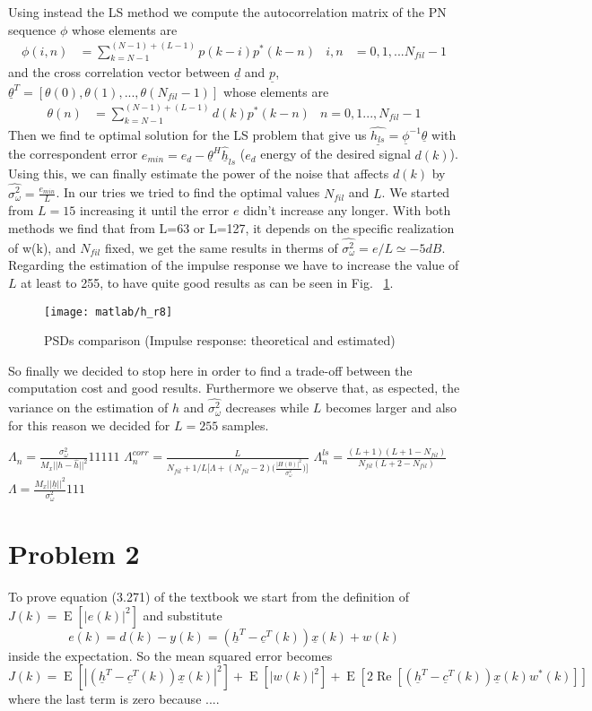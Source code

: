 \documentclass{article}
\renewcommand{\vec}[1]{\underline{#1}}
\renewcommand{\Re}[1]{\operatorname{Re}\left[#1\right]}
\newcommand{\E}[1]{\operatorname{E}\left[#1\right]}
\newcommand{\abs}[1]{\left|#1\right|}
\begin{document}
Using instead the LS method we compute the autocorrelation matrix of the PN sequence $\phi$ whose elements are 
\begin{align*}
\phi(i,n) &= \sum_{k=N-1}^{(N-1) + (L-1)}{p(k-i)p^*(k-n)}&
i,n&=0,1,...N_{fil} -1
\end{align*}
and the cross correlation vector between $\vec{d}$ and $\vec{p}$, $\vec{\theta}^T = [\theta(0), \theta(1),..., \theta(N_{fil}-1)]$ whose elements are
\begin{align*}
\theta(n)& = \sum_{k=N-1}^{(N-1) + (L-1)}{d(k)p^*(k-n)}& n=0,1...,N_{fil}-1
\end{align*}
Then we find te optimal solution for the LS problem that give us  $\vec{\hat{h_{ls}}} = \vec{\phi}^{-1} \vec{\theta}$ with the correspondent error 
$ e_{min} = e_d - \vec{\theta}^H \vec{\hat{h}}_{ls}$ ($e_d$ energy of the desired signal $d(k)$). Using this, we can finally estimate the power of the noise that affects $d(k)$ by $\hat{\sigma_\omega^2} = \frac{e_{min}}{L}$.
\newline In our tries we tried to find the optimal values $N_{fil}$ and $L$. We started from $L = 15$ increasing it until the error $e$ didn't increase any longer. With both methods we find that from L=63 or L=127, it depends on the specific realization of w(k), and $N_{fil}$ fixed, we get the same results in therms of $\hat{\sigma_\omega^2} = e/L\simeq -5 dB$. Regarding the estimation of the impulse response we have to increase the value of $L$ at least to 255, to have quite good results as can be seen in Fig. ~\ref{plot:h}.
\begin{figure}[htbp]
  \centering
  \texttt{[image: matlab/h\_r8]}
  \caption{PSDs comparison (Impulse response: theoretical and estimated)}
    \label{plot:h}
\end{figure}
So finally we decided to stop here in order to find a trade-off between the computation cost and good results. Furthermore we observe that, as espected, the variance on the estimation of $h$ and $\hat{\sigma_\omega^2}$ decreases while $L$ becomes larger and also for this reason we decided for $L=255$ samples.

$\Lambda_n = \frac{\sigma_\omega^2}{M_x || h-\hat{h} ||^2}11111$
$\Lambda_n^{corr} = \frac{L}{N_{fil} + 1/L \bigl[ \Lambda + (N_{fil}-2)\bigl(\frac{|H(0)|^2}{\sigma_\omega^2} \bigr)\bigr]}$
$\Lambda_n^{ls} = \frac{(L+1)(L+1-N_{fil})}{N_{fil}(L+2-N_{fil})}$
$\Lambda = \frac{M_x||\vec{h}||^2}{\sigma_\omega^2}111$


\section*{Problem 2}
To prove equation (3.271) of the textbook we start from the definition
of $J(k) = \E{\abs{e(k)}^2}$ and substitute
\[ e(k) = d(k) - y(k) = \left(\vec{h}^T - \vec{c}^T(k) \right) \vec{x}(k) + w(k) \]
inside the expectation. So the mean squared error becomes
\begin{equation}
  J(k) = \E{\abs{\left(\vec{h}^T - \vec{c}^T(k) \right) \vec{x}(k)}^2}
  + \E{\abs{w(k)}^2}
  + \E{2\Re{\left(\vec{h}^T - \vec{c}^T(k) \right) \vec{x}(k) w^*(k)}}
  \label{eq:J}
\end{equation}
{\color{red} where the last term is zero because ...}.
\end{document}
